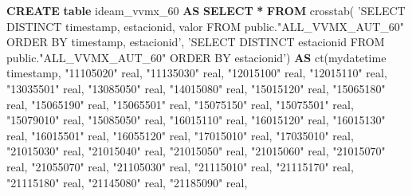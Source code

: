 \documentclass[12pt,twoside]{reedthesis}
\newenvironment{Shaded}{\begin{snugshade}}{\end{snugshade}}
\newcommand{\DataTypeTok}[1]{\textcolor[rgb]{0.13,0.29,0.53}{#1}}
\newcommand{\KeywordTok}[1]{\textcolor[rgb]{0.13,0.29,0.53}{\textbf{#1}}}
\newcommand{\NormalTok}[1]{#1}
\newcommand{\OperatorTok}[1]{\textcolor[rgb]{0.81,0.36,0.00}{\textbf{#1}}}
\newcommand{\OtherTok}[1]{\textcolor[rgb]{0.56,0.35,0.01}{#1}}
\newcommand{\StringTok}[1]{\textcolor[rgb]{0.31,0.60,0.02}{#1}}
\begin{document}
\vspace{0.4cm}
\begin{Shaded}
\begin{Highlighting}[]
    \KeywordTok{CREATE} \KeywordTok{table}\NormalTok{ ideam_vvmx_60 }\KeywordTok{AS}
    \KeywordTok{SELECT} \OperatorTok{*} \KeywordTok{FROM}\NormalTok{ crosstab(}
    \StringTok{'SELECT DISTINCT}
\StringTok{      timestamp,}
\StringTok{      estacionid,}
\StringTok{      valor}
\StringTok{    FROM }
\StringTok{      public."ALL_VVMX_AUT_60" }
\StringTok{    ORDER BY timestamp, estacionid'}\NormalTok{,}
    \StringTok{'SELECT DISTINCT}
\StringTok{      estacionid}
\StringTok{    FROM }
\StringTok{      public."ALL_VVMX_AUT_60" }
\StringTok{    ORDER BY estacionid'}\NormalTok{)}
    \KeywordTok{AS}\NormalTok{ ct(mydatetime }\DataTypeTok{timestamp}\NormalTok{, }\OtherTok{"11105020"} \DataTypeTok{real}\NormalTok{, }\OtherTok{"11135030"} \DataTypeTok{real}\NormalTok{, }\OtherTok{"12015100"} \DataTypeTok{real}\NormalTok{, }\OtherTok{"12015110"} \DataTypeTok{real}\NormalTok{,}
     \OtherTok{"13035501"} \DataTypeTok{real}\NormalTok{, }\OtherTok{"13085050"} \DataTypeTok{real}\NormalTok{, }\OtherTok{"14015080"} \DataTypeTok{real}\NormalTok{, }\OtherTok{"15015120"} \DataTypeTok{real}\NormalTok{, }\OtherTok{"15065180"} \DataTypeTok{real}\NormalTok{, }\OtherTok{"15065190"} \DataTypeTok{real}\NormalTok{, }
     \OtherTok{"15065501"} \DataTypeTok{real}\NormalTok{, }\OtherTok{"15075150"} \DataTypeTok{real}\NormalTok{, }\OtherTok{"15075501"} \DataTypeTok{real}\NormalTok{, }\OtherTok{"15079010"} \DataTypeTok{real}\NormalTok{, }\OtherTok{"15085050"} \DataTypeTok{real}\NormalTok{, }\OtherTok{"16015110"} \DataTypeTok{real}\NormalTok{, }
     \OtherTok{"16015120"} \DataTypeTok{real}\NormalTok{, }\OtherTok{"16015130"} \DataTypeTok{real}\NormalTok{, }\OtherTok{"16015501"} \DataTypeTok{real}\NormalTok{, }\OtherTok{"16055120"} \DataTypeTok{real}\NormalTok{, }\OtherTok{"17015010"} \DataTypeTok{real}\NormalTok{, }\OtherTok{"17035010"} \DataTypeTok{real}\NormalTok{, }
     \OtherTok{"21015030"} \DataTypeTok{real}\NormalTok{, }\OtherTok{"21015040"} \DataTypeTok{real}\NormalTok{, }\OtherTok{"21015050"} \DataTypeTok{real}\NormalTok{, }\OtherTok{"21015060"} \DataTypeTok{real}\NormalTok{, }\OtherTok{"21015070"} \DataTypeTok{real}\NormalTok{, }\OtherTok{"21055070"} \DataTypeTok{real}\NormalTok{, }
     \OtherTok{"21105030"} \DataTypeTok{real}\NormalTok{, }\OtherTok{"21115010"} \DataTypeTok{real}\NormalTok{, }\OtherTok{"21115170"} \DataTypeTok{real}\NormalTok{, }\OtherTok{"21115180"} \DataTypeTok{real}\NormalTok{, }\OtherTok{"21145080"} \DataTypeTok{real}\NormalTok{, }\OtherTok{"21185090"} \DataTypeTok{real}\NormalTok{, }

\end{Highlighting}
\end{Shaded}
\end{document}
